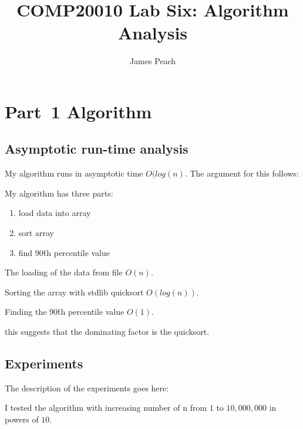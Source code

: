 \documentclass{article}
\title{COMP20010 Lab Six: Algorithm Analysis}
\author{James Peach}
\begin{document}
\maketitle

\section{Part~1 Algorithm}
\label{sec:algorithm1}

\subsection{Asymptotic run-time analysis}

My algorithm runs in asymptotic time $O(log(n)$. The argument for this follows:

My algorithm has three parts:
\begin{enumerate}
	\item load data into array
	\item sort array
	\item find 90\'th percentile value
\end{enumerate}

The loading of the data from file $O(n)$.

Sorting the array with stdlib quicksort $O(log(n))$.

Finding the 90\'th percentile value $O(1)$.

this suggests that the dominating factor is the quicksort.

\subsection{Experiments}
\label{sec:experiments1}
The description of the experiments goes here: 

I tested the algorithm with increasing number of n from $1$ to $10,000,000$ 
in powers of $10$.

\end{document}

